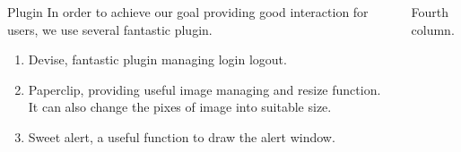 \documentclass[final]{beamer}
\newlength{\sepwid}
\newlength{\onecolwid}
\newlength{\twocolwid}
\begin{document}
\begin{frame}[t]
\begin{columns}[t]
\begin{column}{\onecolwid}
        \begin{block}{Plugin}
            In order to achieve our goal providing good interaction for users, we use several fantastic plugin.
            \begin{enumerate}
            \item Devise, fantastic plugin managing login logout.
            \item Paperclip, providing useful image managing and resize function. It can also change the pixes of image into suitable size.
            \item Sweet alert, a useful function to draw the alert window.
            \end{enumerate}
        \end{block}



    \end{column} %
        
    \begin{column}{\onecolwid}
        Fourth column.
    \end{column}
\end{columns} %









\end{frame}
\end{document}
